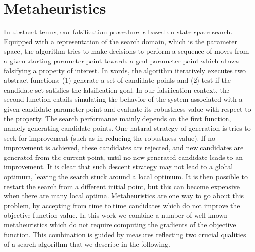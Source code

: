 \section{Metaheuristics}\label{Solvers}
In abstract terms, our falsification procedure is based on state space search. Equipped with a representation of the search domain, which is the parameter space, the algorithm tries to make decisions to perform a sequence of moves from a given starting parameter point towards a goal parameter point which allows falsifying a property of interest. In words, the algorithm iteratively executes two abstract functions: (1) generate a set of candidate points and (2) test if the candidate set satisfies the falsification goal. In our falsification context, the second function entails simulating the behavior of the system associated with a given candidate parameter point and evaluate its robustness value with respect to the property. The search performance mainly depends on the first function, namely generating candidate points. One natural strategy of generation is tries to seek for improvement (such as in reducing the robustness value). If no improvement is achieved, these candidates are rejected, and new candidates are generated from the current point, until no new generated candidate leads to an improvement. It is clear that such descent strategy may not lead to a global optimum, leaving the search stuck around a local optimum. It is then possible to restart the search from a different initial point, but this can become expensive when there are many local optima. Metaheuristics \cite{dreo:hal-01341683} are one way to go about this problem, by accepting from time to time candidates which do not improve the objective function value. In this work we combine a number of well-known metaheuristics which do not require computing the gradients of the objective function. This combination is guided by measures reflecting two crucial qualities of a search algorithm that we describe in the following. %


